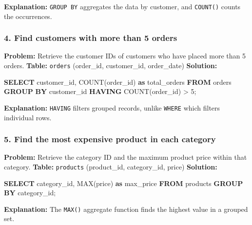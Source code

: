 \documentclass[
  11pt,
  openany,
  oneside]{book}
\newenvironment{Shaded}{}{}
\newcommand{\DecValTok}[1]{\textcolor[rgb]{0.25,0.63,0.44}{#1}}
\newcommand{\FunctionTok}[1]{\textcolor[rgb]{0.02,0.16,0.49}{#1}}
\newcommand{\KeywordTok}[1]{\textcolor[rgb]{0.00,0.44,0.13}{\textbf{#1}}}
\newcommand{\NormalTok}[1]{#1}
\newcommand{\OperatorTok}[1]{\textcolor[rgb]{0.40,0.40,0.40}{#1}}
\begin{document}
\textbf{Explanation:} \texttt{GROUP\ BY} aggregates the data by
customer, and \texttt{COUNT()} counts the occurrences.

\subsubsection{4. Find customers with more than 5
orders}\label{find-customers-with-more-than-5-orders}

\textbf{Problem:} Retrieve the customer IDs of customers who have placed
more than 5 orders. \textbf{Table:} \texttt{orders} (order\_id,
customer\_id, order\_date) \textbf{Solution:}

\begin{Shaded}
\begin{Highlighting}[]
\KeywordTok{SELECT}\NormalTok{ customer\_id, }\FunctionTok{COUNT}\NormalTok{(order\_id) }\KeywordTok{as}\NormalTok{ total\_orders }
\KeywordTok{FROM}\NormalTok{ orders }
\KeywordTok{GROUP} \KeywordTok{BY}\NormalTok{ customer\_id }
\KeywordTok{HAVING} \FunctionTok{COUNT}\NormalTok{(order\_id) }\OperatorTok{\textgreater{}} \DecValTok{5}\NormalTok{;}
\end{Highlighting}
\end{Shaded}

\textbf{Explanation:} \texttt{HAVING} filters grouped records, unlike
\texttt{WHERE} which filters individual rows.

\subsubsection{5. Find the most expensive product in each
category}\label{find-the-most-expensive-product-in-each-category}

\textbf{Problem:} Retrieve the category ID and the maximum product price
within that category. \textbf{Table:} \texttt{products} (product\_id,
category\_id, price) \textbf{Solution:}

\begin{Shaded}
\begin{Highlighting}[]
\KeywordTok{SELECT}\NormalTok{ category\_id, }\FunctionTok{MAX}\NormalTok{(price) }\KeywordTok{as}\NormalTok{ max\_price }
\KeywordTok{FROM}\NormalTok{ products }
\KeywordTok{GROUP} \KeywordTok{BY}\NormalTok{ category\_id;}
\end{Highlighting}
\end{Shaded}

\textbf{Explanation:} The \texttt{MAX()} aggregate function finds the
highest value in a grouped set.
\end{document}
